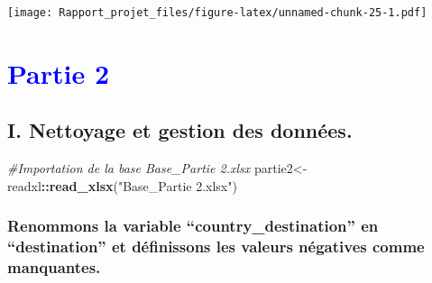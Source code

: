 \documentclass[
]{article}
\newenvironment{Shaded}{\begin{snugshade}}{\end{snugshade}}
\newcommand{\AttributeTok}[1]{\textcolor[rgb]{0.13,0.29,0.53}{#1}}
\newcommand{\CommentTok}[1]{\textcolor[rgb]{0.56,0.35,0.01}{\textit{#1}}}
\newcommand{\ConstantTok}[1]{\textcolor[rgb]{0.56,0.35,0.01}{#1}}
\newcommand{\DecValTok}[1]{\textcolor[rgb]{0.00,0.00,0.81}{#1}}
\newcommand{\FunctionTok}[1]{\textcolor[rgb]{0.13,0.29,0.53}{\textbf{#1}}}
\newcommand{\NormalTok}[1]{#1}
\newcommand{\OtherTok}[1]{\textcolor[rgb]{0.56,0.35,0.01}{#1}}
\newcommand{\SpecialCharTok}[1]{\textcolor[rgb]{0.81,0.36,0.00}{\textbf{#1}}}
\newcommand{\StringTok}[1]{\textcolor[rgb]{0.31,0.60,0.02}{#1}}
\begin{document}
\texttt{[image: Rapport\_projet\_files/figure-latex/unnamed-chunk-25-1.pdf]}

\hypertarget{section-1}{%
\section{\texorpdfstring{\textcolor{blue}{Partie 2}}{}}\label{section-1}}

\hypertarget{i.-nettoyage-et-gestion-des-donnuxe9es.}{%
\subsection{I. Nettoyage et gestion des
données.}\label{i.-nettoyage-et-gestion-des-donnuxe9es.}}

\begin{Shaded}
\begin{Highlighting}[]
\CommentTok{\#Importation de la base Base\_Partie 2.xlsx }
\NormalTok{partie2}\OtherTok{\textless{}{-}}\NormalTok{readxl}\SpecialCharTok{::}\FunctionTok{read\_xlsx}\NormalTok{(}\StringTok{"Base\_Partie 2.xlsx"}\NormalTok{)}
\end{Highlighting}
\end{Shaded}

\hypertarget{renommons-la-variable-country_destination-en-destination-et-duxe9finissons-les-valeurs-nuxe9gatives-comme-manquantes.}{%
\subsubsection{Renommons la variable ``country\_destination'' en
``destination'' et définissons les valeurs négatives comme
manquantes.}\label{renommons-la-variable-country_destination-en-destination-et-duxe9finissons-les-valeurs-nuxe9gatives-comme-manquantes.}}

\begin{Shaded}
\end{Shaded}
\end{document}
